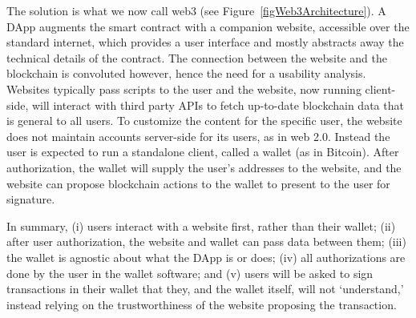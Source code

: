 \documentclass[conference]{IEEEtran}
\begin{document}
The solution is what we now call web3 (see Figure~\ref{figWeb3Architecture}). A DApp augments the smart contract with a companion website, accessible over the standard internet, which provides a user interface and mostly abstracts away the technical details of the contract. The connection between the website and the blockchain is convoluted however, hence the need for a usability analysis. Websites typically pass scripts to the user and the website, now running client-side, will interact with third party APIs to fetch up-to-date blockchain data that is general to all users. To customize the content for the specific user, the website does not maintain accounts server-side for its users, as in web 2.0. Instead the user is expected to run a standalone client, called a wallet (as in Bitcoin). After authorization, the wallet will supply the user's addresses to the website, and the website can propose blockchain actions to the wallet to present to the user for signature. 

In summary, (i) users interact with a website first, rather than their wallet; (ii) after user authorization, the website and wallet can pass data between them; (iii) the wallet is agnostic about what the DApp is or does; (iv) all authorizations are done by the user in the wallet software; and (v) users will be asked to sign transactions in their wallet that they, and the wallet itself, will not `understand,' instead relying on the trustworthiness of the website proposing the transaction.



\end{document}
